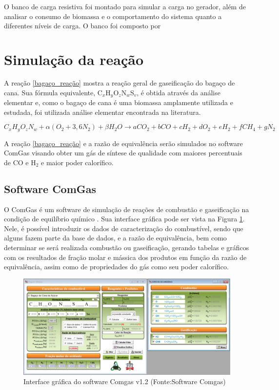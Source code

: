 O banco de carga resistiva foi montado para simular a carga no gerador, além de analisar o consumo de biomassa e o comportamento do sistema quanto a diferentes níveis de carga. O banco foi composto por 


\section{Simulação da reação}

A reação \ref{bagaço_reação} mostra a reação geral de gaseificação do bagaço de cana. Sua fórmula equivalente, C$_x$H$_y$O$_z$N$_w$S$_v$, é obtida através da análise elementar e, como o bagaço de cana é uma biomassa amplamente utilizada e estudada, foi utilizada análise elementar encontrada na literatura.

\begin{equation} \label{bagaço_reação}
C_xH_yO_zN_w + \alpha(O_2 + 3,6N_2) + \beta H_2O \rightarrow aCO_2 + bCO + cH_2 + dO_2 + eH_2 + fCH_4 + gN_2
\end{equation}

A reação \ref{bagaço_reação} e a razão de equivalência serão simulados no software ComGas visando obter um gás de síntese de qualidade com maiores percentuais de CO e H$_2$ e maior poder calorífico.

\subsection{Software ComGas}

O ComGas é um software de simulação de reações de combustão e gaseificação na condição de equilíbrio químico \cite{rendeiro2008}. Sua interface gráfica pode ser vista na Figura \ref{software_comgas}. Nele, é possível introduzir os dados de caracterização do combustível, sendo que alguns fazem parte da base de dados, e a razão de equivalência, bem como determinar se será realizada combustão ou gaseificação, gerando tabelas e gráficos com os resultados de fração molar e mássica dos produtos em função da razão de equivalência, assim como de propriedades do gás como seu poder calorífico.

\begin{figure}[!htb]
	\centering
	\includegraphics[width = 16cm]{software_comgas}
	\caption{Interface gráfica do software Comgas v1.2 (Fonte:Software Comgas)}
	\label{software_comgas}
\end{figure}

